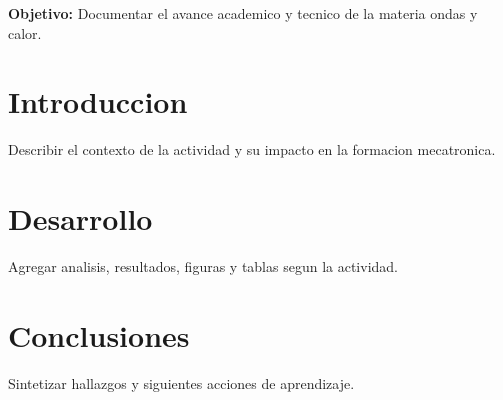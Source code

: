 \documentclass[spanish,letterpaper,oneside]{article}
\begin{document}
\templatePortrait
\templatePagecfg
\onehalfspacing

\begin{abstractd}
\textbf{Objetivo:} Documentar el avance academico y tecnico de la materia ondas y calor.
\end{abstractd}

\templateIndex
\templateFinalcfg

\section{Introduccion}
Describir el contexto de la actividad y su impacto en la formacion mecatronica.

\section{Desarrollo}
Agregar analisis, resultados, figuras y tablas segun la actividad.

\section{Conclusiones}
Sintetizar hallazgos y siguientes acciones de aprendizaje.



\end{document}
